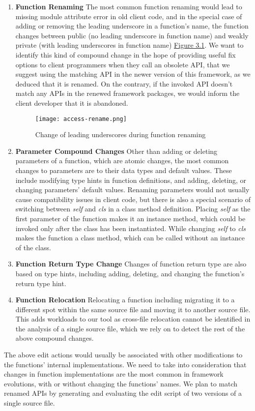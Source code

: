 \begin{enumerate}
  \item \textbf{Function Renaming}
  The most common function renaming would lead to missing module attribute error in old client code, and in the special case of adding or removing the leading underscore in a function's name, the function changes between public (no leading underscore in function name) and weakly private (with leading underscores in function name) \hyperref[fig:access-rename]{Figure 3.1}. We want to identify this kind of compound change in the hope of providing useful fix options to client programmers when they call an obsolete API, that we suggest using the matching API in the newer version of this framework, as we deduced that it is renamed. On the contrary, if the invoked API doesn't match any APIs in the renewed framework packages, we would inform the client developer that it is abandoned.

  \begin{figure}
    \caption{Change of leading underscores during function renaming}
    \label{fig:access-rename}
    \texttt{[image: access-rename.png]}
  \end{figure}

  \item \textbf{Parameter Compound Changes}
  Other than adding or deleting parameters of a function, which are atomic changes, the most common changes to parameters are to their data types and default values. These include modifying type hints in function definitions, and adding, deleting, or changing parameters' default values. Renaming parameters would not usually cause compatibility issues in client code, but there is also a special scenario of switching between \textit{self} and \textit{cls} in a class method definition. Placing \textit{self} as the first parameter of the function makes it an instance method, which could be invoked only after the class has been instantiated. While changing \textit{self} to \textit{cls} makes the function a class method, which can be called without an instance of the class.

  \item \textbf{Function Return Type Change}
  Changes of function return type are also based on type hints, including adding, deleting, and changing the function's return type hint.

  \item \textbf{Function Relocation}
  Relocating a function including migrating it to a different spot within the same source file and moving it to another source file. This adds workloads to our tool as cross-file relocation cannot be identified in the analysis of a single source file, which we rely on to detect the rest of the above compound changes.

\end{enumerate}

The above edit actions would usually be associated with other modifications to the functions' internal implementations. We need to take into consideration that changes in function implementations are the most common in framework evolutions, with or without changing the functions' names. We plan to match renamed APIs by generating and evaluating the edit script of two versions of a single source file.
